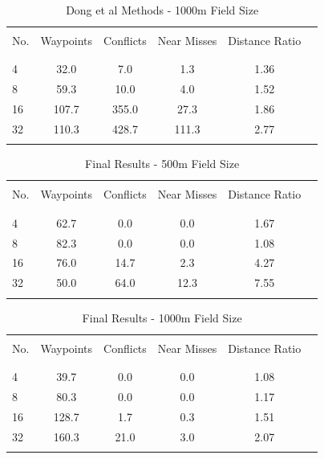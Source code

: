 \documentclass[10pt, conference, compsocconf]{IEEEtran}
\begin{document}
\begin{table}[position here!]
\centering
\caption{Dong et al Methods - 1000m Field Size}
\begin{tabular}{l c c c c c}
\hline
\hline
\\
No.  & Waypoints  & Conflicts & Near Misses & Distance Ratio \\
\\
\hline
\hline
\\
4 & 32.0 & 7.0 & 1.3 & 1.36 \\
8 & 59.3 & 10.0 & 4.0 & 1.52 \\
16 & 107.7 & 355.0 & 27.3 & 1.86 \\
32 &110.3 & 428.7 & 111.3 & 2.77 \\
\\
\hline
\end{tabular}
\label{tab:cc1000}
\end{table}

\begin{table}[position here!]
\centering
\caption{Final Results - 500m Field Size}
\begin{tabular}{l c c c c c}
\hline
\hline
\\
No.  & Waypoints  & Conflicts & Near Misses & Distance Ratio \\
\\
\hline
\hline
\\
4 & 62.7 & 0.0 & 0.0 & 1.67 \\
8 & 82.3 & 0.0 & 0.0 & 1.08 \\
16 &  76.0 & 14.7 & 2.3 & 4.27 \\
32 &  50.0 & 64.0 & 12.3 & 7.55 \\
\\
\hline
\end{tabular}
\label{tab:cc500}
\end{table}

\begin{table}[position here!]
\centering
\caption{Final Results - 1000m Field Size}
\begin{tabular}{l c c c c c}
\hline
\hline
\\
No.  & Waypoints  & Conflicts & Near Misses & Distance Ratio \\
\\
\hline
\hline
\\
4 & 39.7 & 0.0 & 0.0 & 1.08 \\
8 & 80.3 & 0.0 & 0.0 & 1.17 \\
16 &  128.7 & 1.7 & 0.3 & 1.51 \\
32 &  160.3 & 21.0 & 3.0 & 2.07 \\
\\
\hline
\end{tabular}
\label{tab:cc1000}
\end{table}
\end{document}
